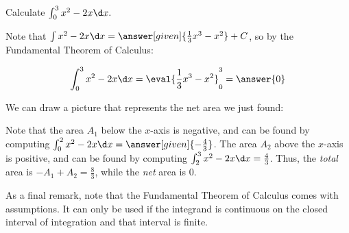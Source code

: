 \documentclass[nooutcomes]{ximera}
\begin{document}
\begin{example}
Calculate $\int_0^{3} x^2-2x \d x.$  

\begin{explanation}
Note that $\int x^2-2x \d x = \answer[given]{\frac{1}{3}x^3-x^2}+C$, so by the Fundamental Theorem of Calculus:

\[
\int_0^3 x^2-2x \d x = \eval{\frac{1}{3}x^3-x^2 }_0^3 = \answer{0}
\]
\end{explanation}

We can draw a picture that represents the net area we just found:

\begin{image}
\end{image}

Note that the area $A_1$ below the $x$-axis is negative, and can be found by computing $\int_0^2 x^2-2x \d x = \answer[given]{-\frac{4}{3}}$.  The area $A_2$ above the $x$-axis is positive, and can be found by computing $\int_2^3 x^2-2x \d x = \frac{4}{3}$.  Thus, the \emph{total} area is $-A_1+A_2 = \frac{8}{3}$, while the \emph{net} area is $0$.  
\end{example}

As a final remark, note that the Fundamental Theorem of Calculus comes with assumptions.  It can only be used if the integrand is continuous on the closed interval of integration and that interval is finite.
\end{document}
